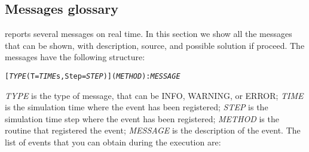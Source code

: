 \subsection{Messages glossary}
\label{sss:running:messages}
%
\NAME reports several messages on real time. In this section we show all
the messages that can be shown, with description, source, and possible
solution if proceed.\rc
%
The messages have the following structure:
%
\begin{alltt}
[\emph{TYPE} (T=\emph{TIME}s, Step=\emph{STEP})] (\emph{METHOD}): \emph{MESSAGE}
\end{alltt}
%
\textit{TYPE} is the type of message, that can be INFO, WARNING, or ERROR;
\textit{TIME} is the simulation time where the event has been registered;
\textit{STEP} is the simulation time step where the event has been registered;
\textit{METHOD} is the \NAME routine that registered the event; \textit{MESSAGE}
is the description of the event.\rc
%
The list of events that you can obtain during the \NAME execution are:
%



%
